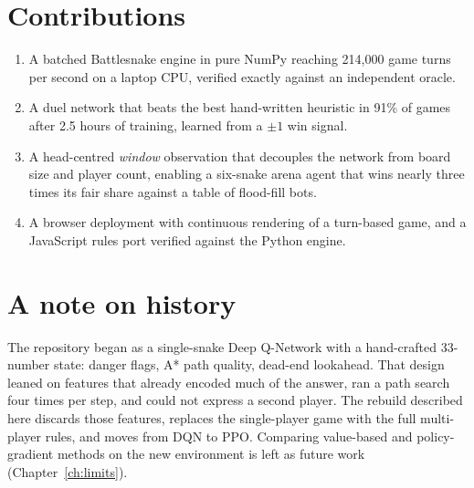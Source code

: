 \section{Contributions}

\begin{keybox}
\begin{enumerate}
\item A batched Battlesnake engine in pure NumPy reaching 214{,}000 game turns per second
  on a laptop CPU, verified exactly against an independent oracle.
\item A duel network that beats the best hand-written heuristic in 91\% of games after
  2.5 hours of training, learned from a $\pm1$ win signal.
\item A head-centred \emph{window} observation that decouples the network from board size
  and player count, enabling a six-snake arena agent that wins nearly three times its fair
  share against a table of flood-fill bots.
\item A browser deployment with continuous rendering of a turn-based game, and a
  JavaScript rules port verified against the Python engine.
\end{enumerate}
\end{keybox}

\section{A note on history}

The repository began as a single-snake Deep Q-Network with a hand-crafted 33-number
state: danger flags, A* path quality, dead-end lookahead. That design leaned on features
that already encoded much of the answer, ran a path search four times per step, and
could not express a second player. The rebuild described here discards those features,
replaces the single-player game with the full multi-player rules, and moves from DQN to
PPO. Comparing value-based and policy-gradient methods on the new environment is left as
future work (Chapter~\ref{ch:limits}).
